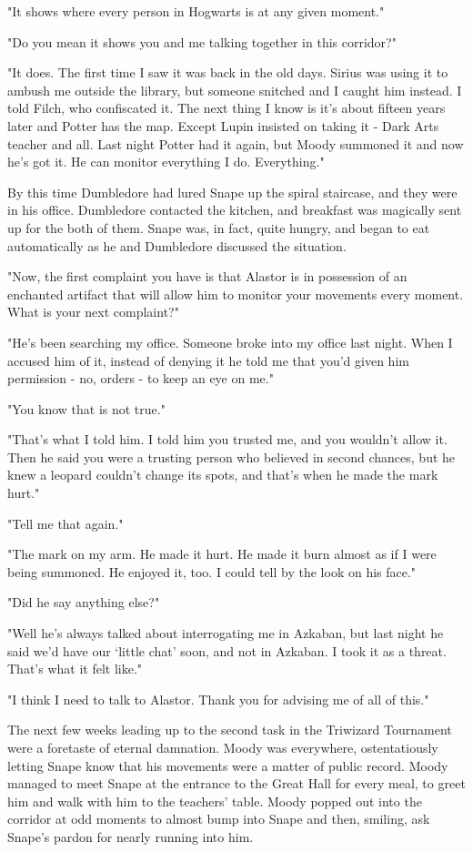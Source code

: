 \documentclass[a4paper,11pt]{article}
\begin{document}
"It shows where every person in Hogwarts is at any given moment."

"Do you mean it shows you and me talking together in this corridor?"

"It does. The first time I saw it was back in the old days. Sirius was using it to ambush me outside the library, but someone snitched and I caught him instead. I told Filch, who confiscated it. The next thing I know is it's about fifteen years later and Potter has the map. Except Lupin insisted on taking it - Dark Arts teacher and all. Last night Potter had it again, but Moody summoned it and now he's got it. He can monitor everything I do. Everything."

By this time Dumbledore had lured Snape up the spiral staircase, and they were in his office. Dumbledore contacted the kitchen, and breakfast was magically sent up for the both of them. Snape was, in fact, quite hungry, and began to eat automatically as he and Dumbledore discussed the situation.

"Now, the first complaint you have is that Alastor is in possession of an enchanted artifact that will allow him to monitor your movements every moment. What is your next complaint?"

"He's been searching my office. Someone broke into my office last night. When I accused him of it, instead of denying it he told me that you'd given him permission - no, orders - to keep an eye on me."

"You know that is not true."

"That's what I told him. I told him you trusted me, and you wouldn't allow it. Then he said you were a trusting person who believed in second chances, but he knew a leopard couldn't change its spots, and that's when he made the mark hurt."

"Tell me that again."

"The mark on my arm. He made it hurt. He made it burn almost as if I were being summoned. He enjoyed it, too. I could tell by the look on his face."

"Did he say anything else?"

"Well he's always talked about interrogating me in Azkaban, but last night he said we'd have our `little chat' soon, and not in Azkaban. I took it as a threat. That's what it felt like."

"I think I need to talk to Alastor. Thank you for advising me of all of this."

The next few weeks leading up to the second task in the Triwizard Tournament were a foretaste of eternal damnation. Moody was everywhere, ostentatiously letting Snape know that his movements were a matter of public record. Moody managed to meet Snape at the entrance to the Great Hall for every meal, to greet him and walk with him to the teachers' table. Moody popped out into the corridor at odd moments to almost bump into Snape and then, smiling, ask Snape's pardon for nearly running into him.
\end{document}
